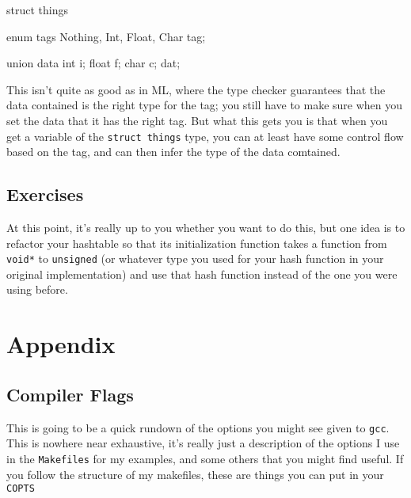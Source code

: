 \documentclass[ebook,11pt,oneside,openany]{memoir}
\newcommand{\cf}[1]{\texttt{#1}}
\begin{document}
\begin{code}[language=C]
struct things {
  enum tags {
    Nothing,
    Int,
    Float,
    Char
  } tag;
  
  union data {
    int i;
    float f;
    char c;
  } dat;
}
\end{code}

This isn't quite as good as in ML, where the type checker guarantees that the data contained is the right type for the tag; you still have to make sure when you set the data that it has the right tag. But what this gets you is that when you get a variable of the \cf{struct things} type, you can at least have some control flow based on the tag, and can then infer the type of the data comtained.


\section{Exercises}

At this point, it's really up to you whether you want to do this, but one idea is to refactor your hashtable so that its initialization function takes a function from \cf{void*} to \cf{unsigned} (or whatever type you used for your hash function in your original implementation) and use that hash function instead of the one you were using before.

\chapter{Appendix}
\section{Compiler Flags}

This is going to be a quick rundown of the options you might see given to \cf{gcc}. This is nowhere near exhaustive, it's really just a description of the options I use in the \cf{Makefiles} for my examples, and some others that you might find useful. If you follow the structure of my makefiles, these are things you can put in your \cf{COPTS}
\end{document}
